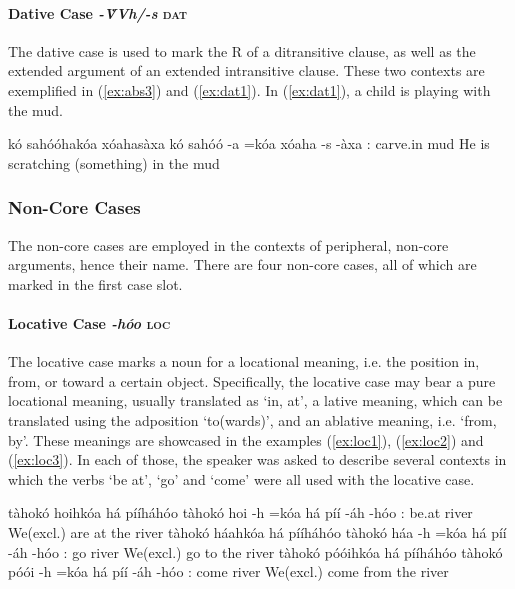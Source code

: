 \documentclass[a4paper, 12pt, oneside]{memoir}
\newcommand{\emh}[1]{\textit{#1}}
\begin{document}
\paragraph{Dative Case \emh{-V̀Vh/-s} \textsc{dat}}
The dative case is used to mark the R of a ditransitive clause, as well as the extended argument of an extended intransitive clause. These two contexts are exemplified in (\ref{ex:abs3}) and (\ref{ex:dat1}). In (\ref{ex:dat1}), a child is playing with the mud.
\begin{examples}
\ex \label{ex:dat1}
\words kó sahóóhakóa xóahasàxa
\bits kó sahóó -a =kóa xóaha -s -àxa
\gloss {\Tsm}:{\Subject} carve.in {\St} {\Decl} mud {\Dat} {\Ont}
\tr He is scratching (something) in the mud
\end{examples}
\subsubsection{Non-Core Cases}\label{sncorecase}
The non-core cases are employed in the contexts of peripheral, non-core arguments, hence their name. There are four non-core cases, all of which are marked in the first case slot.
\paragraph{Locative Case \emh{-hóo} \textsc{loc}}
The locative case marks a noun for a locational meaning, i.e. the position in, from, or toward a certain object. Specifically, the locative case may bear a pure locational meaning, usually translated as `in, at', a lative meaning, which can be translated using the adposition `to(wards)', and an ablative meaning, i.e. `from, by'. These meanings are showcased in the examples (\ref{ex:loc1}), (\ref{ex:loc2}) and (\ref{ex:loc3}). In each of those, the speaker was asked to describe several contexts in which the verbs `be at', `go' and `come' were all used with the locative case. 
\begin{examples}
\ex \label{ex:loc1}
\words tàhokó hoihkóa há pííháhóo
\bits tàhokó hoi -h =kóa há píí -áh -hóo
\gloss {\Fat}:{\Subject} be.at {\Ff} {\Decl} {\Cngr} river {\Aug} {\Loc}
\tr We(excl.) are at the river
\ex \label{ex:loc2}
\words tàhokó háahkóa há pííháhóo
\bits tàhokó háa -h =kóa há píí -áh -hóo
\gloss {\Fat}:{\Subject} go {\Ff} {\Decl} {\Cngr} river {\Aug} {\Loc}
\tr We(excl.) go to the river
\ex \label{ex:loc3}
\words tàhokó póóihkóa há pííháhóo
\bits tàhokó póói -h =kóa há píí -áh -hóo
\gloss {\Fat}:{\Subject} come {\Ff} {\Decl} {\Cngr} river {\Aug} {\Loc}
\tr We(excl.) come from the river
\end{examples}
\end{document}
